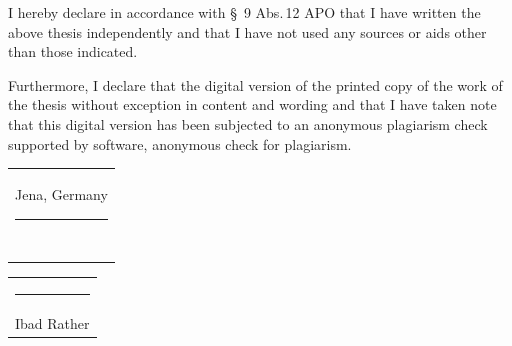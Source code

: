 \documentclass[
thesis  %
]{csthes}
\begin{document}
I hereby declare in accordance with \S~9 Abs.\,12 APO that I have written the above {\thesistype}thesis independently and that I have not used any sources or aids other than those indicated. 

Furthermore, I declare that the digital version of the printed copy of the {\thesistype}work 
of the {\thesistype} thesis without exception in content and wording and that I have taken note 
that this digital version has been subjected to an anonymous plagiarism check supported by software, 
anonymous check for plagiarism. 


\bigskip
\bigskip

\begin{tabular}{@{}l@{}}
  Jena, Germany \rule[-0.8em]{7em}{0.5pt}\\[2ex]
  ~
\end{tabular}
\hspace{\fill}%
\begin{tabular}{@{}c@{}}
  \rule[-0.8em]{19em}{0.5pt}\\[2ex]
  {Ibad Rather}
\end{tabular}\hspace{\fill}

\end{document}
